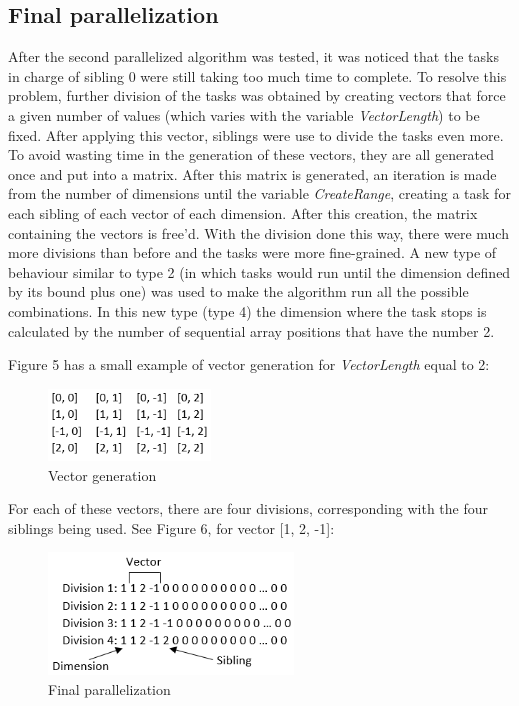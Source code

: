 \documentclass[conference]{IEEEtran}
\begin{document}
\subsection{Final parallelization}
After the second parallelized algorithm was tested, it was noticed that the tasks in charge of sibling 0 were still taking too much time to complete. To resolve this problem, further division of the tasks was obtained by creating vectors that force a given number of values (which varies with the variable \emph{VectorLength}) to be fixed. After applying this vector, siblings were use to divide the tasks even more. 
To avoid wasting time in the generation of these vectors, they are all generated once and put into a matrix. After this matrix is generated, an iteration is made from the number of dimensions until the variable \emph{CreateRange}, creating a task for each sibling of each vector of each dimension. After this creation, the matrix containing the vectors is free'd.
With the division done this way, there were much more divisions than before and the tasks were more fine-grained. A new type of behaviour similar to type 2 (in which tasks would run until the dimension defined by its bound plus one) was used to make the algorithm run all the possible combinations. In this new type (type 4) the dimension where the task stops is calculated by the number of sequential array positions that have the number 2. 

Figure 5 has a small example of vector generation for \emph{VectorLength} equal to 2:

\begin{figure}[ht!]
\centering
\includegraphics[width=43mm]{imgParallel/GeracaoVetores}
\caption{Vector generation}
\end{figure}

For each of these vectors, there are four divisions, corresponding with the four siblings being used. See Figure 6, for vector [1, 2, -1]:

\begin{figure}[ht!]
\centering
\includegraphics[width=65mm]{imgParallel/ParalelizacaoFinal}
\caption{Final parallelization}
\end{figure}
\end{document}
